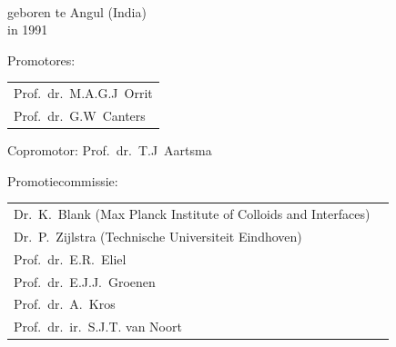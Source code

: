 \begin{titlepage}
\begin{center}
\makeatletter
{\Large\titlefont\bfseries\@firstname\ {\titleshape\@lastname}}
\makeatother

\bigskip
\bigskip


geboren te Angul (India) \\
in 1991

\vspace*{2\bigskipamount}

\end{center}

\clearpage
\thispagestyle{empty}

\noindent Promotores:

\medskip\noindent
\begin{tabular}{l}
    Prof.\ dr.\ M.A.G.J\ Orrit \\
    Prof.\ dr.\ G.W\ Canters
\end{tabular}

\medskip
\noindent Copromotor: Prof.\ dr.\ T.J\ Aartsma

\medskip
\noindent Promotiecommissie:

\medskip\noindent
\begin{tabular}{ll}
    Dr.\ K.\ Blank (Max Planck Institute of Colloids and Interfaces) \\
    Dr.\ P.\ Zijlstra (Technische Universiteit Eindhoven) \\
    Prof.\ dr.\ E.R.\ Eliel \\
    Prof.\ dr.\ E.J.J.\ Groenen \\
    Prof.\ dr.\ A.\ Kros \\
    Prof.\ dr.\ ir.\ S.J.T. van Noort \\
\end{tabular}



\end{titlepage}
